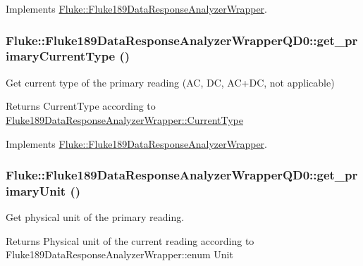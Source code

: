 Implements \hyperlink{classFluke_1_1Fluke189DataResponseAnalyzerWrapper_ad10698c83895619a6fbf251c1256ce11}{Fluke::Fluke189DataResponseAnalyzerWrapper}.\hypertarget{classFluke_1_1Fluke189DataResponseAnalyzerWrapperQD0_acffb9af55e2d690060ef210977c3c933}{
\subsubsection[{get\_\-primaryCurrentType}]{ Fluke::Fluke189DataResponseAnalyzerWrapperQD0::get\_\-primaryCurrentType ()}}
\label{classFluke_1_1Fluke189DataResponseAnalyzerWrapperQD0_acffb9af55e2d690060ef210977c3c933}
Get current type of the primary reading (AC, DC, AC+DC, not applicable) \begin{DoxyReturn}{Returns}
CurrentType according to \hyperlink{classFluke_1_1Fluke189DataResponseAnalyzerWrapper_afef24496da239e3613c40ad3582d7adc}{Fluke189DataResponseAnalyzerWrapper::CurrentType} 
\end{DoxyReturn}


Implements \hyperlink{classFluke_1_1Fluke189DataResponseAnalyzerWrapper_afb7361d6963bb0edd9194ba72a1583df}{Fluke::Fluke189DataResponseAnalyzerWrapper}.\hypertarget{classFluke_1_1Fluke189DataResponseAnalyzerWrapperQD0_af71dd62d9f81866ad3cb96c580754329}{
\subsubsection[{get\_\-primaryUnit}]{ Fluke::Fluke189DataResponseAnalyzerWrapperQD0::get\_\-primaryUnit ()}}
\label{classFluke_1_1Fluke189DataResponseAnalyzerWrapperQD0_af71dd62d9f81866ad3cb96c580754329}
Get physical unit of the primary reading. \begin{DoxyReturn}{Returns}
Physical unit of the current reading according to Fluke189DataResponseAnalyzerWrapper::enum Unit 
\end{DoxyReturn}



